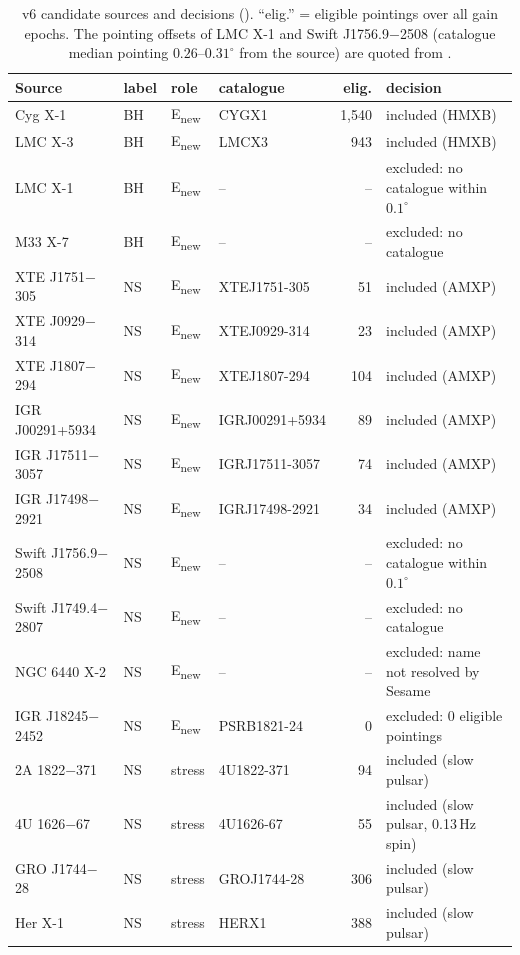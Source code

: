 \begin{table}[htbp]
\centering\footnotesize
\caption[v6 external-source verification]{v6 candidate sources and decisions ().
``elig.'' = eligible pointings over all gain epochs. The pointing offsets of LMC X-1 and Swift J1756.9$-$2508 (catalogue
median pointing $0.26$--$0.31^\circ$ from the source) are quoted from .}
\label{tab:p3verify}
\setlength{\tabcolsep}{4pt}
\begin{tabularx}{\textwidth}{@{}llllrX@{}}
\toprule
Source & label & role & catalogue & elig. & decision \\
\midrule
Cyg X-1 & BH & E\textsubscript{new} & CYGX1 & 1,540 & included (HMXB) \\
LMC X-3 & BH & E\textsubscript{new} & LMCX3 & 943 & included (HMXB) \\
LMC X-1 & BH & E\textsubscript{new} & -- & -- & excluded: no catalogue within $0.1^\circ$ \\
M33 X-7 & BH & E\textsubscript{new} & -- & -- & excluded: no catalogue \\
XTE J1751$-$305 & NS & E\textsubscript{new} & XTEJ1751-305 & 51 & included (AMXP) \\
XTE J0929$-$314 & NS & E\textsubscript{new} & XTEJ0929-314 & 23 & included (AMXP) \\
XTE J1807$-$294 & NS & E\textsubscript{new} & XTEJ1807-294 & 104 & included (AMXP) \\
IGR J00291+5934 & NS & E\textsubscript{new} & IGRJ00291+5934 & 89 & included (AMXP) \\
IGR J17511$-$3057 & NS & E\textsubscript{new} & IGRJ17511-3057 & 74 & included (AMXP) \\
IGR J17498$-$2921 & NS & E\textsubscript{new} & IGRJ17498-2921 & 34 & included (AMXP) \\
Swift J1756.9$-$2508 & NS & E\textsubscript{new} & -- & -- & excluded: no catalogue within $0.1^\circ$ \\
Swift J1749.4$-$2807 & NS & E\textsubscript{new} & -- & -- & excluded: no catalogue \\
NGC 6440 X-2 & NS & E\textsubscript{new} & -- & -- & excluded: name not resolved by Sesame \\
IGR J18245$-$2452 & NS & E\textsubscript{new} & PSRB1821-24 & 0 & excluded: 0 eligible pointings \\
2A 1822$-$371 & NS & stress & 4U1822-371 & 94 & included (slow pulsar) \\
4U 1626$-$67 & NS & stress & 4U1626-67 & 55 & included (slow pulsar, 0.13\,Hz spin) \\
GRO J1744$-$28 & NS & stress & GROJ1744-28 & 306 & included (slow pulsar) \\
Her X-1 & NS & stress & HERX1 & 388 & included (slow pulsar) \\
\bottomrule
\end{tabularx}
\end{table}

